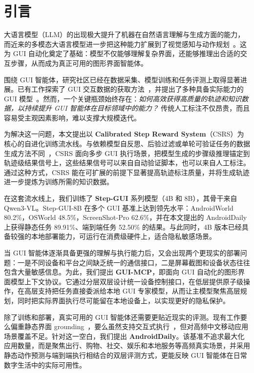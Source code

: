 \section{引言}

大语言模型（LLM）的出现极大提升了机器在自然语言理解与生成方面的能力，而近来的多模态大语言模型进一步把这种能力扩展到了视觉感知与动作规划~\citep{Bai2025Qwen3VL, comanici2025gemini_gemini25, gpt5, claudeopus45, guo2025seed1_seed15}。这为 GUI 自动化奠定了基础：模型不仅能够理解复杂界面，还能够推理出合适的交互步骤，从而成为真正可用的图形界面智能体。

围绕 GUI 智能体，研究社区已经在数据采集、模型训练和任务评测上取得显著进展。已有工作探索了 GUI 交互数据的获取方法~\citep{gao2024mobileviews, rawles2023androidinthewild, liu2025scalecua, wang2025opencua}，并提出了多种具备实际能力的 GUI 模型~\citep{qin2025ui_uitars1, wang2025ui_uitars2, ye2025mobile_mobileagentv3, zeng2025uitron}。然而，一个关键瓶颈始终存在：\emph{如何高效获得高质量的轨迹和知识数据，以持续提升 GUI 智能体在目标领域中的能力？} 传统人工标注不仅昂贵，而且容易受主观因素影响，难以支撑大规模迭代。

为解决这一问题，本文提出以 \textbf{Calibrated Step Reward System}（CSRS）为核心的自进化训练流水线。与依赖模型自反思、后验过滤或单轮可验证任务的数据生成方法不同~\citep{zelikman2022star, madaan2023self_selfrefine, jung2023impossibledistill, gulcehre2023reinforced_rest}，CSRS 面向多步 GUI 执行场景，把模型生成的步骤级推理锚定到轨迹级结果信号上，这些结果信号可以来自自动验证脚本，也可以来自人工标注。通过这种方式，CSRS 能在可扩展的前提下显著提高轨迹标注质量，并将生成轨迹进一步提炼为训练所需的知识数据。

在这套流水线上，我们训练了 \textbf{Step-GUI} 系列模型（4B 和 8B），其骨干来自 Qwen3-VL。Step-GUI-8B 在多个 GUI 基准上达到领先水平：AndroidWorld 80.2\%，OSWorld 48.5\%，ScreenShot-Pro 62.6\%，并在本文提出的 AndroidDaily 上获得静态任务 89.91\%、端到端任务 52.50\% 的结果。与此同时，4B 版本已经具备较强的本地部署能力，可运行在消费级硬件上，适合隐私敏感场景。

当 GUI 智能体逐渐具备更强的理解与执行能力后，又会出现两个更现实的部署问题：一是不同设备和平台之间缺乏统一的通信接口，二是屏幕截图和设备状态往往包含大量敏感信息。为此，我们提出 \textbf{GUI-MCP}，即面向 GUI 自动化的图形界面模型上下文协议。它通过分层双层设计统一设备控制接口，在低层提供原子级操作，在高层支持把任务直接委派给本地 GUI 专家模型，从而让主模型聚焦高层规划，同时把实际界面执行尽可能留在本地设备上，以实现更好的隐私保护。

除了训练和部署，真实可用的 GUI 智能体还需要更贴近现实的评测。现有工作要么偏重静态界面 grounding~\citep{cheng2024seeclick, wu2024atlas, li2025screenspotpro, li2025autogui, burns2022dataset_motif, rastogi2021uibert_refexp, zhang2024llamatouch, liu2024visualwebbench_vwb}，要么虽然支持交互式执行~\citep{rawles2024androidworld, xie2024osworld}，但对高频中文移动应用场景覆盖不足。针对这一空白，我们提出 \textbf{AndroidDaily}。该基准不追求最大化应用数量，而是聚焦出行、购物、社交、娱乐和本地服务等高频真实场景，并采用静态动作预测与端到端执行相结合的双层评测方式，更能反映 GUI 智能体在日常数字生活中的实际可用性。

